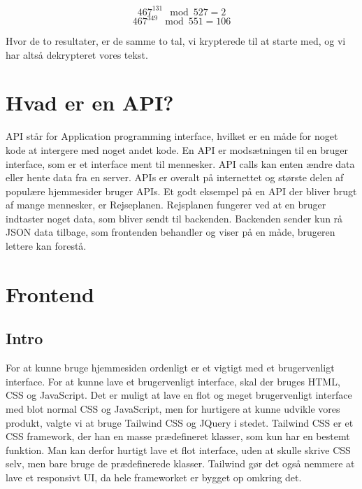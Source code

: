 \documentclass[a4paper,12pt]{extarticle}
\begin{document}
    \begin{equation}
        467^{131} \mod 527 = 2 \label{eq:decrypt-ex1}
    \end{equation}
    \begin{equation}
        467^{349} \mod 551 = 106 \label{eq:decrypt-ex2}
    \end{equation}

    Hvor de to resultater, er de samme to tal, vi krypterede til at starte med, og vi har altså dekrypteret vores tekst.

    \section{Hvad er en API?}\label{sec:hvad-er-en-api}
    API står for Application programming interface, hvilket er en måde for noget kode at intergere med noget andet kode.
    En API er modsætningen til en bruger interface, som er et interface ment til mennesker.
    API calls kan enten ændre data eller hente data fra en server.
    APIs er overalt på internettet og største delen af populære hjemmesider bruger APIs.
    Et godt eksempel på en API der bliver brugt af mange mennesker, er Rejseplanen.
    Rejsplanen fungerer ved at en bruger indtaster noget data, som bliver sendt til backenden.
    Backenden sender kun rå JSON data tilbage, som frontenden behandler og viser på en måde, brugeren lettere kan forestå.


    \section{Frontend}\label{sec:frontend}
    \subsection{Intro}
    For at kunne bruge hjemmesiden ordenligt er et vigtigt med et brugervenligt interface.
    For at kunne lave et brugervenligt interface, skal der bruges HTML, CSS og JavaScript.
    Det er muligt at lave en flot og meget brugervenligt interface med blot normal CSS og JavaScript,
    men for hurtigere at kunne udvikle vores produkt, valgte vi at bruge Tailwind CSS og JQuery i stedet.
    Tailwind CSS er et CSS framework, der han en masse prædefineret klasser, som kun har en bestemt funktion.
    Man kan derfor hurtigt lave et flot interface, uden at skulle skrive CSS selv, men bare bruge de prædefinerede klasser.
    Tailwind gør det også nemmere at lave et responsivt UI, da hele frameworket er bygget op omkring det.
\end{document}
